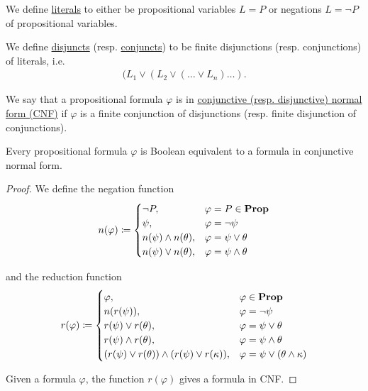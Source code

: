 \begin{definition}\label{def:conjunctive_normal_form}
  We define \ul{literals} to either be propositional variables $L = P$ or negations $L = \neg P$ of propositional variables.

  We define \ul{disjuncts} (resp. \ul{conjuncts}) to be finite disjunctions (resp. conjunctions) of literals, i.e.
  \begin{align*}
    (L_1 \lor (L_2 \lor (\ldots \lor L_n) \ldots ).
  \end{align*}

  We say that a propositional formula $\varphi$ is in \ul{conjunctive (resp. disjunctive) normal form (CNF)} if $\varphi$ is a finite conjunction of disjunctions (resp. finite disjunction of conjunctions).
\end{definition}

\begin{proposition}\label{thm:conjunctive_normal_form_reduction}
  Every propositional formula $\varphi$ is Boolean equivalent to a formula in conjunctive normal form.
\end{proposition}
\begin{proof}
  We define the negation function
  \begin{align*}
    n(\varphi) \coloneqq \begin{cases}
      \neg P,                                                   &\varphi = P \in \operatorname{\mathbf{Prop}} \\
      \psi,                                                     &\varphi = \neg \psi \\
      n(\psi) \land n(\theta),                                  &\varphi = \psi \lor \theta \\
      n(\psi) \lor n(\theta),                                   &\varphi = \psi \land \theta \\
    \end{cases}
  \end{align*}

  and the reduction function
  \begin{align*}
    r(\varphi) \coloneqq \begin{cases}
      \varphi,                                                  &\varphi \in \operatorname{\mathbf{Prop}} \\
      n(r(\psi)),                                               &\varphi = \neg \psi \\
      r(\psi) \lor r(\theta),                                   &\varphi = \psi \lor \theta \\
      r(\psi) \land r(\theta),                                  &\varphi = \psi \land \theta \\
      (r(\psi) \lor r(\theta)) \land (r(\psi) \lor r(\kappa)),  &\varphi = \psi \lor (\theta \land \kappa) \\
    \end{cases}
  \end{align*}

  Given a formula $\varphi$, the function $r(\varphi)$ gives a formula in CNF.
\end{proof}


